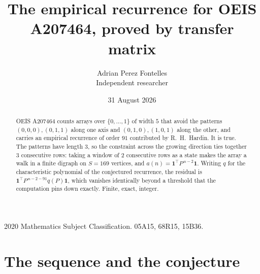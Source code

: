 \documentclass[11pt,a4paper]{article}
\title{The empirical recurrence for OEIS A207464, proved by transfer matrix}
\author{Adrian Perez Fontelles\\ \small Independent researcher}
\date{31 August 2026}
\theoremstyle{plain}
\theoremstyle{definition}
\begin{document}
\maketitle

\begin{abstract}
OEIS A207464 counts arrays over $\{0,\dots,1\}$ of width $5$ that avoid the patterns
$(0,0,0), (0,1,1)$ along one axis and $(0,1,0), (1,0,1)$ along the other, and carries an empirical recurrence of
order $91$ contributed by R.~H.~Hardin. It is true. The patterns have length $3$, so
the constraint across the growing direction ties together $3$ consecutive rows: taking a
window of $2$ consecutive rows as a state makes the array a walk in a finite digraph
on $S=169$ vertices, and $a(n)=\mathbf{1}^{\!\top}P^{\,n-2}\mathbf{1}$. Writing $q$
for the characteristic polynomial of the conjectured recurrence, the residual is
$\mathbf{1}^{\!\top}P^{\,n-2-91}q(P)\mathbf{1}$, which vanishes identically
beyond a threshold that the computation pins down exactly. Finite, exact, integer.
\end{abstract}

\noindent\small 2020 Mathematics Subject Classification. 05A15, 68R15, 15B36.\normalsize

\section{The sequence and the conjecture}
\end{document}
